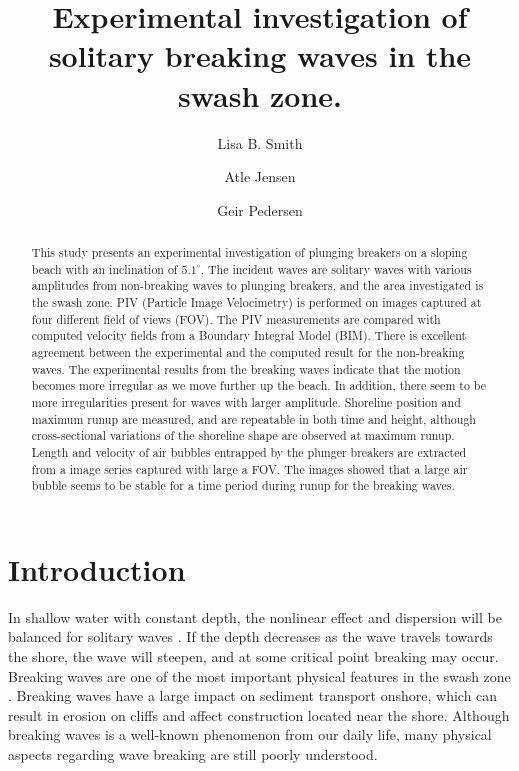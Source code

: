 \documentclass[a4paper, 11pt, english, twoside, openright]{article}
\title{Experimental investigation of solitary breaking waves in the swash zone. }
\author[1]{Lisa B. Smith}
\author[1]{Atle Jensen}
\author[1]{Geir Pedersen}
\affil[1]{ Department of Mathematics, University of Oslo, Norway}
\begin{document}
\maketitle


\setlength{\marginparwidth}{2cm}

\begin{abstract}
This study presents an experimental investigation of plunging breakers on a sloping beach with an inclination of $5.1^{\circ}$. The incident waves are solitary waves with various amplitudes from non-breaking waves to plunging breakers, and the area investigated is the swash zone. PIV (Particle Image Velocimetry) is performed on images captured at four different field of views (FOV). The PIV measurements are compared with computed velocity fields from a Boundary Integral Model (BIM). 
There is excellent agreement between the experimental and the computed result for the non-breaking waves. The experimental results from the breaking waves indicate that the motion becomes more irregular as we move further up the beach. In addition, there seem to be more irregularities present  for waves with larger amplitude. Shoreline position and maximum runup are measured, and are repeatable in both time and height, although  cross-sectional variations of the shoreline shape are observed at maximum runup.  Length and velocity of air bubbles entrapped by the plunger breakers are extracted from a image series captured with large a FOV. The images showed that a large air bubble seems to be stable for a time period during runup for the breaking waves.
\end{abstract}

\section{Introduction}
In shallow water with constant depth, the nonlinear effect and dispersion will be balanced for solitary waves \citep{peregrine1983breaking}. If the depth decreases as the wave travels towards the shore, the wave will steepen, and at some critical  point breaking may occur. Breaking waves are one of the most important physical features in the swash zone \citep{elfrink2002hydrodynamics}. Breaking waves have a large impact on sediment transport onshore, which can result in erosion on cliffs and affect construction located near the shore. Although breaking waves is a well-known phenomenon from our daily life, many physical aspects regarding wave breaking are still poorly understood.
\end{document}
